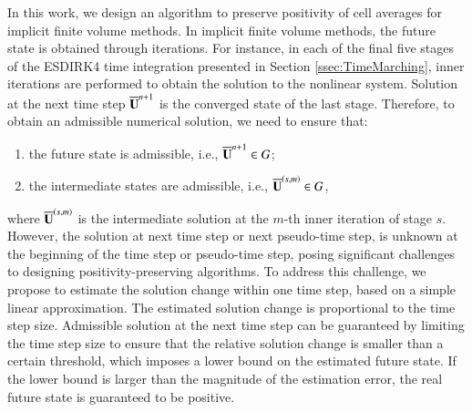 In this work, we design an algorithm to preserve positivity of cell averages for implicit finite volume methods. In implicit finite volume methods, the future state is obtained through iterations. For instance, in each of the final five stages of the ESDIRK4 time integration presented in Section \ref{ssec:TimeMarching}, inner iterations are performed to obtain the solution to the  nonlinear system. Solution at the next time step $\overline{\mathbf{U}}^{n+1}$ is the converged state of the last stage. Therefore, to obtain an admissible numerical solution, we need to ensure that:
\begin{enumerate}[label=(\alph*)]
    \item the future state is admissible, i.e., $\overline{\mathbf{U}}^{n+1} \in G$;
    \item the intermediate states are admissible, i.e., $\overline{\mathbf{U}}^{\left(s,m\right)} \in G$,
\end{enumerate}
where $\overline{\mathbf{U}}^{\left(s,m\right)}$ is the intermediate solution at the $m$-th inner iteration of stage $s$. However, the solution at next time step or next pseudo-time step, is unknown at the beginning of the time step or pseudo-time step, posing significant challenges to designing positivity-preserving algorithms. 
To address this challenge, we propose to estimate the solution change within one time step, based on a simple linear approximation. The estimated solution change is proportional to the time step size. Admissible solution at the next time step can be guaranteed by limiting the time step size to ensure that the relative solution change is smaller than a certain threshold, which imposes a lower bound on the estimated future state. If the lower bound is larger than the magnitude of the estimation error, the real future state is guaranteed to be positive.   

